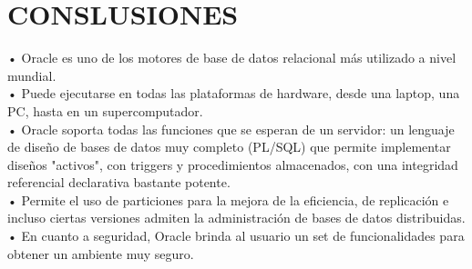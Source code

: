 \section{CONSLUSIONES}
\begin{enumerate}
\vspace{12pt}

• Oracle es uno de los motores de base de datos relacional más utilizado a nivel mundial.\\
• Puede ejecutarse en todas las plataformas de hardware, desde una laptop, una PC, hasta en un supercomputador.\\
• Oracle soporta todas las funciones que se esperan de un servidor: un lenguaje de diseño de bases de datos muy completo (PL/SQL) que permite implementar diseños "activos", con triggers y procedimientos almacenados, con una integridad referencial declarativa bastante potente.\\
• Permite el uso de particiones para la mejora de la eficiencia, de replicación e incluso ciertas versiones admiten la administración de bases de datos distribuidas.\\
• En cuanto a seguridad, Oracle brinda al usuario un set de funcionalidades para obtener un ambiente muy seguro.\\

\end{enumerate}
